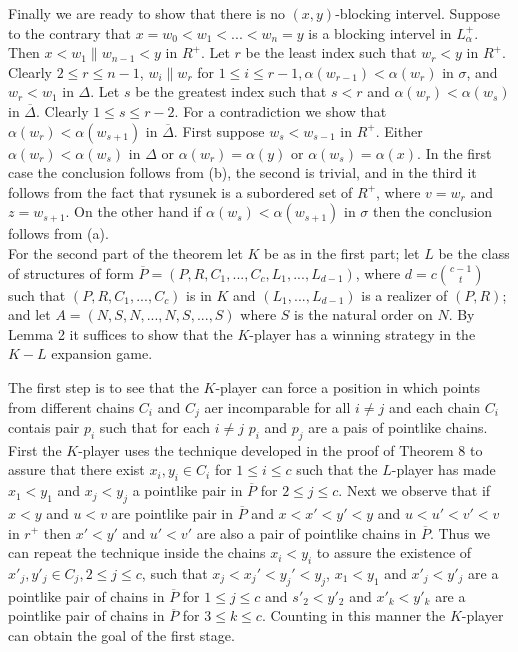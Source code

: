 \documentclass[twoside]{article}
\begin{document}
Finally we are ready to show that there is no $(x,y)$-blocking intervel. Suppose to the contrary that
$x = w_0 < w_1<...<w_n = y$ is a blocking intervel in $L^+_{\alpha}$. Then $x<w_1\parallel w_{n-1}<y$
in $R^+$. Let $r$ be the least index such that $w_r < y$ in $R^+$. Clearly $2 \leq r\leq n-1$, $w_i \parallel w_r$
for $1 \leq i \leq r-1, \alpha (w_{r-1}) < \alpha (w_r)$ in $\sigma$, and $w_r < w_1$ in $\Delta$. Let
$s$ be the greatest index such that $s<r$ and $\alpha (w_r) < \alpha (w_s)$ in $\overline{\Delta}$.
Clearly $1\leq s\leq r-2$. For a contradiction we show that $\alpha (w_r)< \alpha(w_{s+1})$ in
$\overline{\Delta}$. First suppose $w_s < w_{s-1}$ in $R^+$. Either $\alpha (w_r) < \alpha (w_s)$
in $\Delta$  or $\alpha (w_r) = \alpha (y)$ or $\alpha (w_s) = \alpha (x)$. In the first case
the conclusion follows from (b), the second is trivial, and in the third it follows from the fact that
rysunek is a subordered set of $R^+$, where $v= w_r$ and $z = w_{s+1}$. On the other hand if 
$\alpha (w_s) < \alpha (w_{s+1})$ in $\sigma$ then the conclusion follows from (a).\\
%
%

For the second part of the theorem let $K$ be as in the first part; let $L$ be the class
of structures of form $\overline{P} = (P,R,C_1,...,C_c,L_1,...,L_{d-1})$, where $d=c{{c-1}\choose {t}}$
such that $(P,R,C_1,...,C_c)$ is in $K$ and $(L_1,...,L_{d-1})$ is a realizer of $(P,R)$;
and let $A=(N,S,N,...,N,S,...,S)$ where $S$ is the natural order on $N$. By Lemma 2 it suffices to show that the $K$-player
has a winning strategy in the $K-L$ expansion game.

The first step is to see that the $K$-player can force a position in which points
from different chains $C_i$ and $C_j$ aer incomparable for all $i \neq j$ and each chain $C_i$ contais pair $p_i$ such that
for each $i \neq j$ $p_i$ and $p_j$ are a pais of pointlike chains. First the $K$-player uses the 
technique developed in the proof of Theorem 8 to assure that there exist $x_i,y_i \in C_i$
for $1 \leq i \leq c$ such that the $L$-player has made $x_1<y_1$ and $x_j< y_j$ a pointlike 
pair in $\overline{P}$ for $2 \leq j \leq c$. Next we observe that if $x<y$ and $u<v$ are pointlike pair in 
$\overline{P}$ and $x<x'<y'<y$ and $u<u'<v'<v$ in $r^+$ then $x'<y'$ and $u'<v'$ are also a pair of 
pointlike chains in $\overline{P}$. Thus we can repeat the technique inside the chains $x_i < y_i$
to assure the existence of $x'_j,y'_j \in C_j, 2 \leq j\leq c$, such that $x_j<x_j'<y_j'<y_j$,
$x_1<y_1$ and $x'_j<y'_j$ are a pointlike pair of chains in $\overline{P}$ for $1\leq j\leq c$ 
and $s'_2<y'_2$ and $x'_k < y'_k$ are a pointlike pair of chains in $\overline{P}$ for $3 \leq k \leq c$.
Counting in this manner the $K$-player can obtain the goal of the first stage.
\end{document}
